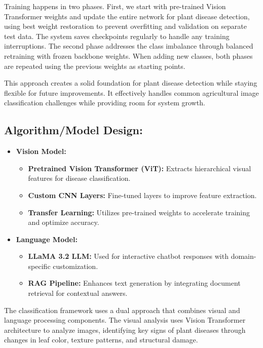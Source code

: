 Training happens in two phases. First, we start with pre-trained Vision Transformer weights and update the entire network for plant disease detection, using best weight restoration to prevent overfitting and validation on separate test data. The system saves checkpoints regularly to handle any training interruptions. The second phase addresses the class imbalance through balanced retraining with frozen backbone weights. When adding new classes, both phases are repeated using the previous weights as starting points.

This approach creates a solid foundation for plant disease detection while staying flexible for future improvements. It effectively handles common agricultural image classification challenges while providing room for system growth.




\subsection{Algorithm/Model Design:}
\begin{itemize}

\item \textbf{Vision Model:}
\begin{itemize}
\item \textbf{Pretrained Vision Transformer (ViT):} Extracts hierarchical visual features for disease classification.
\item \textbf{Custom CNN Layers:} Fine-tuned layers to improve feature extraction.
\item \textbf{Transfer Learning:} Utilizes pre-trained weights to accelerate training and optimize accuracy.
\end{itemize}

\item \textbf{Language Model:}
\begin{itemize}
\item \textbf{LLaMA 3.2 LLM:} Used for interactive chatbot responses with domain-specific customization.
\item \textbf{RAG Pipeline:} Enhances text generation by integrating document retrieval for contextual answers.
\end{itemize}

\end{itemize}

The classification framework uses a dual approach that combines visual and language processing components. The visual analysis uses Vision Transformer architecture to analyze images, identifying key signs of plant diseases through changes in leaf color, texture patterns, and structural damage.

